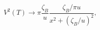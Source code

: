 \begin{equation}
V^{2}(T)\rightarrow \pi\frac{\zeta_B}{u}
\frac{\zeta_B/\pi u}{x^{2}+(\zeta_B/u)^{2}},
\end{equation}

